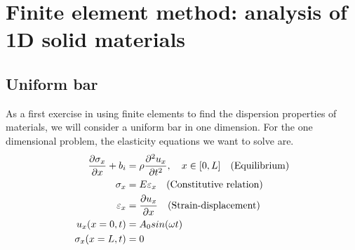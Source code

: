 \documentclass{article}
\begin{document}
\section{Finite element method: analysis of 1D solid materials}
\subsection{Uniform bar}
As a first exercise in using finite elements to find the dispersion properties 
of materials, we will consider a uniform bar in one dimension. For the one 
dimensional problem, the elasticity equations we want to solve are.
\begin{align}
\frac{\partial \sigma_x}{\partial x} + b_i &= \rho \frac{\partial^2 
u_x}{\partial t^2},\quad x\in[0,L]\quad\textnormal{(Equilibrium)} \\
\sigma_x &= E \varepsilon_x\quad\textnormal{(Constitutive relation)}\\
\varepsilon_x &= \frac{\partial u_x}{\partial 
x}\quad\textnormal{(Strain-displacement)}\\
u_x(x=0,t) &= A_0sin(\omega t) \\
\sigma_x(x=L,t) &= 0
\end{align}
\end{document}
